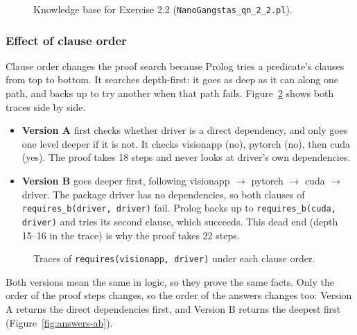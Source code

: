 \documentclass{article}
\newcommand{\team}{NanoGangstas}          %
\begin{document}
\begin{figure}[!htb]
  \VerbatimInput{../\team_qn_2_2.pl}
  \caption{Knowledge base for Exercise 2.2 (\texttt{\team\_qn\_2\_2.pl}).}
  \label{fig:kb22}
\end{figure}

\subsubsection{Effect of clause order}

Clause order changes the proof search because Prolog tries a predicate's clauses from top to bottom.
It searches depth-first: it goes as deep as it can along one path, and backs up to try another when that path fails.
Figure~\ref{fig:traces-ab} shows both traces side by side.

\begin{itemize}
  \item \textbf{Version A} first checks whether driver is a direct dependency, and only goes one level deeper if it is not.
        It checks visionapp (no), pytorch (no), then cuda (yes). The proof takes 18 steps and never looks at driver's own dependencies.
  \item \textbf{Version B} goes deeper first, following visionapp $\rightarrow$ pytorch $\rightarrow$ cuda $\rightarrow$ driver.
        The package driver has no dependencies, so both clauses of \texttt{requires\_b(driver, driver)} fail.
        Prolog backs up to \texttt{requires\_b(cuda, driver)} and tries its second clause, which succeeds.
        This dead end (depth 15--16 in the trace) is why the proof takes 22 steps.
\end{itemize}

\begin{figure}[!htb]
  \begin{minipage}[t]{0.495\linewidth}
  \end{minipage}\hfill
  \begin{minipage}[t]{0.495\linewidth}
  \end{minipage}
  \caption{Traces of \texttt{requires(visionapp, driver)} under each clause order.}
  \label{fig:traces-ab}
\end{figure}

Both versions mean the same in logic, so they prove the same facts. Only the order of the proof steps changes,
so the order of the answers changes too: Version A returns the direct dependencies first, and Version B returns the deepest first (Figure~\ref{fig:answers-ab}).
\end{document}
